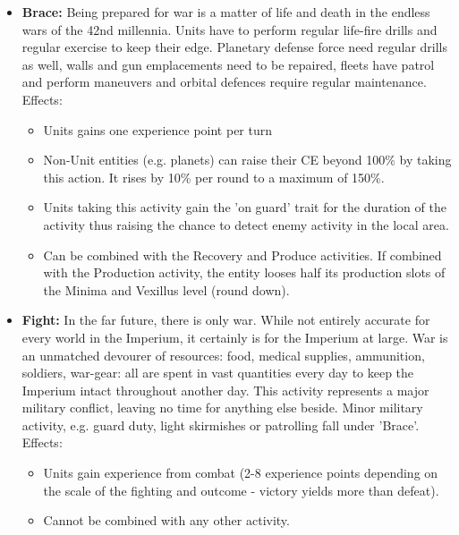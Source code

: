 \begin{itemize}
    \item \textbf{Brace:} Being prepared for war is a matter of life and death in the endless wars of the 42nd millennia. Units have to perform regular life-fire drills and regular exercise to keep their edge. Planetary defense force need regular drills as well, walls and gun emplacements need to be repaired, fleets have patrol and perform maneuvers and orbital defences require regular maintenance. Effects:
    \begin{itemize}
        \item Units gains one experience point per turn
        \item Non-Unit entities (e.g. planets) can raise their CE beyond 100\% by taking this action. It rises by 10\% per round to a maximum of 150\%.
        \item Units taking this activity gain the 'on guard' trait for the duration of the activity thus raising the chance to detect enemy activity in the local area.
        \item Can be combined with the Recovery and Produce activities. If combined with the Production activity, the entity looses half its production slots of the Minima and Vexillus level (round down).
    \end{itemize}
    
    \item \textbf{Fight:} In the far future, there is only war. While not entirely accurate for every world in the Imperium, it certainly is for the Imperium at large. War is an unmatched devourer of resources: food, medical supplies, ammunition, soldiers, war-gear: all are spent in vast quantities every day to keep the Imperium intact throughout another day. This activity represents a major military conflict, leaving no time for anything else beside. Minor military activity, e.g. guard duty, light skirmishes or patrolling fall under 'Brace'.
    Effects:
    \begin{itemize}
        \item Units gain experience from combat (2-8 experience points depending on the scale of the fighting and outcome - victory yields more than defeat).
        \item Cannot be combined with any other activity.
    \end{itemize}
    

\end{itemize}

